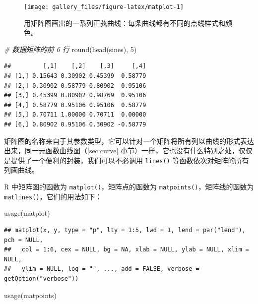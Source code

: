 \documentclass[
  b5paper,
  UTF8,twoside]{book}
\newenvironment{Shaded}{\begin{snugshade}}{\end{snugshade}}
\newcommand{\CommentTok}[1]{\textcolor[rgb]{0.56,0.35,0.01}{\textit{#1}}}
\newcommand{\DecValTok}[1]{\textcolor[rgb]{0.00,0.00,0.81}{#1}}
\newcommand{\FunctionTok}[1]{\textcolor[rgb]{0.00,0.00,0.00}{#1}}
\newcommand{\NormalTok}[1]{#1}
\begin{document}
\begin{figure}

{\centering \texttt{[image: gallery\_files/figure-latex/matplot-1]} 

}

\caption[用矩阵图画出的一系列正弦曲线]{用矩阵图画出的一系列正弦曲线：每条曲线都有不同的点线样式和颜色。}\label{fig:matplot}
\end{figure}

\begin{Shaded}
\begin{Highlighting}[]
\CommentTok{\# 数据矩阵的前 6 行}
\FunctionTok{round}\NormalTok{(}\FunctionTok{head}\NormalTok{(sines), }\DecValTok{5}\NormalTok{)}
\end{Highlighting}
\end{Shaded}

\begin{verbatim}
##         [,1]    [,2]    [,3]     [,4]
## [1,] 0.15643 0.30902 0.45399  0.58779
## [2,] 0.30902 0.58779 0.80902  0.95106
## [3,] 0.45399 0.80902 0.98769  0.95106
## [4,] 0.58779 0.95106 0.95106  0.58779
## [5,] 0.70711 1.00000 0.70711  0.00000
## [6,] 0.80902 0.95106 0.30902 -0.58779
\end{verbatim}

矩阵图的名称来自于其参数类型，它可以针对一个矩阵将所有列以曲线的形式表达出来，同一元函数曲线图（\ref{sec:curve} 小节）一样，它也没有什么特别之处，仅仅是提供了一个便利的封装，我们可以不必调用 \texttt{lines()} 等函数依次对矩阵的所有列画曲线。

R 中矩阵图的函数为 \texttt{matplot()}，矩阵点的函数为 \texttt{matpoints()}，矩阵线的函数为 \texttt{matlines()}，它们的用法如下：

\begin{Shaded}
\begin{Highlighting}[]
\FunctionTok{usage}\NormalTok{(matplot)}
\end{Highlighting}
\end{Shaded}

\begin{verbatim}
## matplot(x, y, type = "p", lty = 1:5, lwd = 1, lend = par("lend"), pch = NULL,
##   col = 1:6, cex = NULL, bg = NA, xlab = NULL, ylab = NULL, xlim = NULL,
##   ylim = NULL, log = "", ..., add = FALSE, verbose = getOption("verbose"))
\end{verbatim}

\begin{Shaded}
\begin{Highlighting}[]
\FunctionTok{usage}\NormalTok{(matpoints)}
\end{Highlighting}
\end{Shaded}
\end{document}
